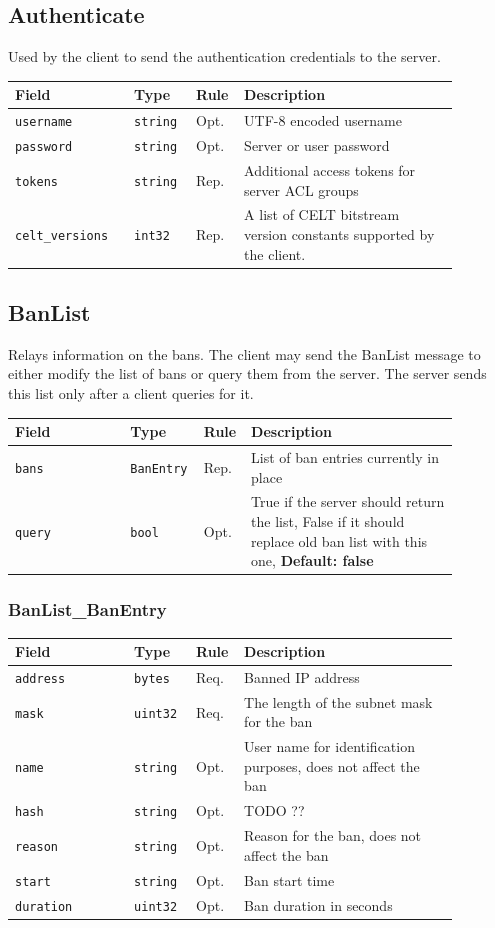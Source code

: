 \documentclass[11pt]{article} %
\newenvironment{mumbleMessageEx}
{%
	\small
	\renewcommand\arraystretch{1.5}
	\begin{tabular}{p{0.25\linewidth}p{0.13\linewidth}p{0.05\linewidth}p{0.45\linewidth}}
	Field & Type & Rule & Description \\
	\hline
}
{%
	\end{tabular}
	\renewcommand\arraystretch{1.0}
}
\newcommand{\mumbleMessageExItem}[4]{ \texttt{#1} & \texttt{#2} & #3 & #4 \\ }
\begin{document}
\subsection{Authenticate}
\label{msg:authenticate}

Used by the client to send the authentication credentials to the server.

\begin{mumbleMessageEx}
\mumbleMessageExItem{username}{string}{Opt.}{UTF-8 encoded username}
\mumbleMessageExItem{password}{string}{Opt.}{Server or user password}
\mumbleMessageExItem{tokens}{string}{Rep.}{Additional access tokens for server ACL groups}
\mumbleMessageExItem{celt\_versions}{int32}{Rep.}{A list of CELT bitstream version constants supported by the client.}
\end{mumbleMessageEx}

\subsection{BanList} 
\label{msg:banList}

Relays information on the bans. The client may send the BanList message to either modify the list of bans or query them from the server. The server sends this list only after a client queries for it.

\begin{mumbleMessageEx}
\mumbleMessageExItem{bans}{BanEntry}{Rep.}{List of ban entries currently in place}
\mumbleMessageExItem{query}{bool}{Opt.}{True if the server should return the list, False if it should replace old ban list with this one, \textbf{Default: false}}
\end{mumbleMessageEx}

\subsubsection{BanList\_BanEntry}
\label{msg:banEntry}

\begin{mumbleMessageEx}
\mumbleMessageExItem{address}{bytes}{Req.}{Banned IP address}
\mumbleMessageExItem{mask}{uint32}{Req.}{The length of the subnet mask for the ban}
\mumbleMessageExItem{name}{string}{Opt.}{User name for identification purposes, does not affect the ban}
\mumbleMessageExItem{hash}{string}{Opt.}{TODO ??}
\mumbleMessageExItem{reason}{string}{Opt.}{Reason for the ban, does not affect the ban}
\mumbleMessageExItem{start}{string}{Opt.}{Ban start time}
\mumbleMessageExItem{duration}{uint32}{Opt.}{Ban duration in seconds}
\end{mumbleMessageEx}
\end{document}
